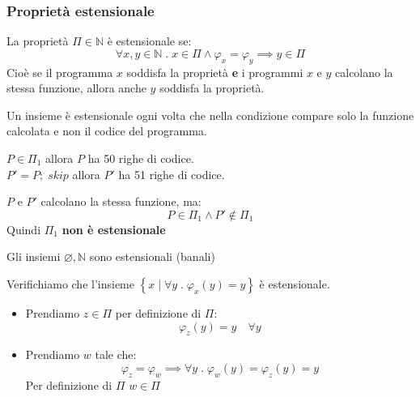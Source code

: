 \documentclass[a4paper]{article}
\begin{document}
\subsubsection{Proprietà estensionale}
\begin{definition}
  La proprietà \( \Pi \in \mathbb{N} \) è estensionale se:
  \[
    \forall x, y \in \mathbb{N} \;.\; x \in \Pi \wedge \varphi_x = \varphi_y \implies y \in \Pi
  \] 
  Cioè se il programma \( x \) soddisfa la proprietà \textbf{e} i programmi \( x \) e \( y \) 
  calcolano la stessa funzione, allora anche \( y \) soddisfa la proprietà.

  \vspace{1em}
  \noindent
  Un insieme è estensionale ogni volta che nella condizione compare solo la funzione
  calcolata e non il codice del programma.
\end{definition}
\begin{example}
  \( P \in \Pi_1 \) allora \( P \) ha 50 righe di codice.\\
  \( P' = P;\; skip \) allora \( P' \) ha 51 righe di codice.

  \vspace{1em}
  \noindent
  \( P \) e \( P' \) calcolano la stessa funzione, ma:
  \[
    P \in \Pi_1 \wedge P' \notin \Pi_1
  \] 
  Quindi \( \Pi_1 \) \textbf{non è estensionale}
\end{example}
\begin{example}
  Gli insiemi \( \varnothing, \mathbb{N} \) sono estensionali (banali)
\end{example}
\begin{example}
  Verifichiamo che l'insieme \( \left\{ \left. x \;\right|\; \forall y \;.\; \varphi_x(y) = y \right\} \)
    è estensionale.
    \begin{itemize}
      \item Prendiamo \( z \in \Pi  \) per definizione di \( \Pi  \):
        \[
          \varphi_z(y) = y \quad \forall y
        \] 
      \item Prendiamo \( w \) tale che:
        \[
          \varphi_z = \varphi_w \implies \forall y \;.\; \varphi_w(y) = \varphi_z(y) = y
        \] 
        Per definizione di \( \Pi  \) \( w \in \Pi \) 
    \end{itemize}
\end{example}
\end{document}
